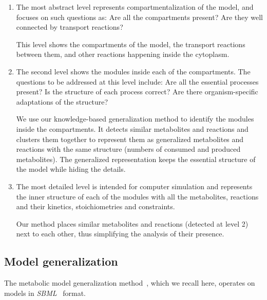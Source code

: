 \documentclass{bmcart}
\begin{document}
\begin{enumerate}
\item The most abstract level represents compartmentalization of the model, and focuses on such questions as: Are all the compartments present? Are they well connected by transport reactions?

This level shows the compartments of the model, the transport reactions between them, and other reactions happening inside the cytoplasm.

\item The second level shows the modules inside each of the compartments. The questions to be addressed at this level include: Are all the essential processes present? Is the structure of each process correct? Are there organism-specific adaptations of the structure?

We use our knowledge-based generalization method to identify the modules inside the compartments. It detects similar metabolites and reactions and clusters them together to represent them as generalized metabolites and reactions with the same structure (numbers of consumed and produced metabolites). The generalized representation keeps the essential structure of the model while hiding the details.

\item The most detailed level is intended for computer simulation and represents the inner structure of each of the modules with all the metabolites, reactions and their kinetics, stoichiometries and constraints.

Our method places similar metabolites and reactions (detected at level 2) next to each other, thus simplifying the analysis of their presence.

\end{enumerate}

\subsection*{Model generalization}
The metabolic model generalization method~\cite{Zhukova2014}, which we recall here, operates on models in \textit{SBML}~\cite{Hucka08} format.

\end{document}
